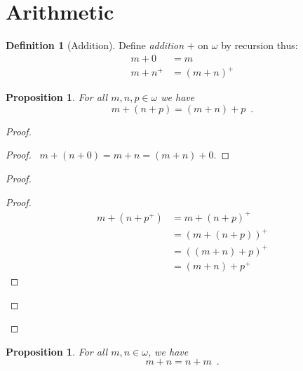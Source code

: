 \documentclass{report}
\let\qed\relax
\newtheorem{prop}[ax]{Proposition}
\theoremstyle{definition}
\newtheorem{df}[ax]{Definition}
\begin{document}
\section{Arithmetic}

\begin{df}[Addition]
Define \emph{addition} $+$ on $\omega$ by recursion thus:
\begin{align*}
	m + 0 & = m \\
	m + n^+ & = (m + n)^+
\end{align*}
\end{df}

\begin{prop}
\label{prop:plus_assoc}
For all $m,n,p \in \omega$ we have
\[ m + (n + p) = (m + n) + p \enspace . \]
\end{prop}

\begin{proof}
\pf
{}
\begin{proof}
	\pf\ $m + (n + 0) = m + n = (m + n) + 0$.
\end{proof}
\begin{proof}
	\begin{proof}
		\pf
		\begin{align*}
			m + (n + p^+) & = m + (n + p)^+ \\
			& = (m + (n + p))^+ \\
			& = ((m + n) + p)^+ \\
			& = (m + n) + p^+
		\end{align*}
	\end{proof}
\end{proof}
\qed
\end{proof}

\begin{prop}
\label{prop:plus_comm}
For all $m,n \in \omega$, we have
\[ m + n = n + m \enspace . \]
\end{prop}
\end{document}
